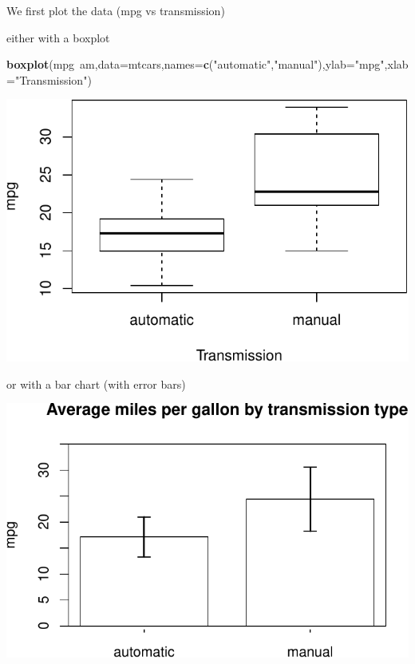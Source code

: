 \documentclass[]{article}
\newenvironment{Shaded}{\begin{snugshade}}{\end{snugshade}}
\newcommand{\KeywordTok}[1]{\textcolor[rgb]{0.13,0.29,0.53}{\textbf{{#1}}}}
\newcommand{\DataTypeTok}[1]{\textcolor[rgb]{0.13,0.29,0.53}{{#1}}}
\newcommand{\StringTok}[1]{\textcolor[rgb]{0.31,0.60,0.02}{{#1}}}
\newcommand{\NormalTok}[1]{{#1}}
\numberwithin{equation}{section}
\begin{document}
We first plot the data (mpg vs transmission)

either with a boxplot

\begin{Shaded}
\begin{Highlighting}[]
\KeywordTok{boxplot}\NormalTok{(mpg~am,}\DataTypeTok{data=}\NormalTok{mtcars,}\DataTypeTok{names=}\KeywordTok{c}\NormalTok{(}\StringTok{"automatic"}\NormalTok{,}\StringTok{"manual"}\NormalTok{),}\DataTypeTok{ylab=}\StringTok{"mpg"}\NormalTok{,}\DataTypeTok{xlab=}\StringTok{"Transmission"}\NormalTok{)}
\end{Highlighting}
\end{Shaded}

\includegraphics{index_files/figure-latex/unnamed-chunk-173-1.pdf}

or with a bar chart (with error bars)

\includegraphics{index_files/figure-latex/unnamed-chunk-174-1.pdf}
\end{document}
